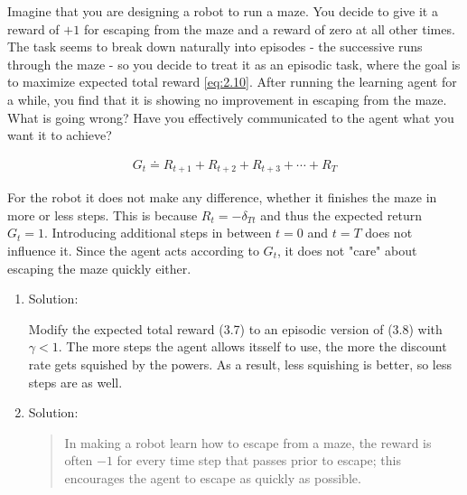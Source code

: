 
\begin{exercise}[Exercise 3.7]

Imagine that you are designing a robot to run a maze.
You decide to give it a reward of $+1$ for escaping from the maze and a reward of zero at all other times.
The task seems to break down naturally into episodes - the successive runs through the maze - so you decide to treat it as an episodic task, where the goal is to maximize expected total reward \eqref{eq:2.10}.
After running the learning agent for a while, you find that it is showing no improvement in escaping from the maze.
What is going wrong?
Have you effectively communicated to the agent what you want it to achieve?

\begin{align} \label{eq:2.10}
    G_t \doteq R_{t+1} + R_{t+2} + R_{t+3} + \cdots + R_T
\end{align}

\end{exercise}


\begin{solution}

For the robot it does not make any difference, whether it finishes the maze in more or less steps.
This is because $R_t = -\delta_{T t}$ and thus the expected return $G_t = 1$.
Introducing additional steps in between $t = 0$ and $t = T$ does not influence it.
Since the agent acts according to $G_t$, it does not "care" about escaping the maze quickly either.

\begin{enumerate}[label = \arabic*.]

    \item Solution:

    Modify the expected total reward (3.7) to an episodic version of (3.8) with $\gamma < 1$.
	The more steps the agent allows itsself to use, the more the discount rate gets squished by the powers.
	As a result, less squishing is better, so less steps are as well.

    \item Solution:

    \blockquote{In making a robot learn how to escape from a maze, the reward is often $-1$ for every time step that passes prior to escape; this encourages the agent to escape as quickly as possible.}
    \cite*[page 53]{SuttonRichardS2018Rl:a}

\end{enumerate}

\end{solution}

